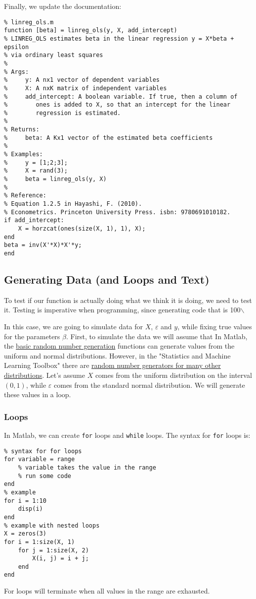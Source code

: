 \documentclass[12pt, a4paper]{article}
\begin{document}
Finally, we update the documentation:
\lstset{language=matlab,label= ,caption= ,captionpos=b,firstnumber=1,numbers=left,style=Matlab-editor}
\begin{lstlisting}
% linreg_ols.m
function [beta] = linreg_ols(y, X, add_intercept)
% LINREG_OLS estimates beta in the linear regression y = X*beta + epsilon
% via ordinary least squares
%
% Args:
%     y: A nx1 vector of dependent variables
%     X: A nxK matrix of independent variables
%     add_intercept: A boolean variable. If true, then a column of
%        ones is added to X, so that an intercept for the linear
%        regression is estimated.
%
% Returns:
%     beta: A Kx1 vector of the estimated beta coefficients
%
% Examples:
%     y = [1;2;3];
%     X = rand(3);
%     beta = linreg_ols(y, X)
%
% Reference:
% Equation 1.2.5 in Hayashi, F. (2010).
% Econometrics. Princeton University Press. isbn: 9780691010182.
if add_intercept:
    X = horzcat(ones(size(X, 1), 1), X);
end
beta = inv(X'*X)*X'*y;
end
\end{lstlisting}
\subsection{Generating Data (and Loops and Text)}
\label{sec:org2098963}
To test if our function is actually doing what we think it is doing, we need to test it.
Testing is imperative when programming, since generating code that is 100$\backslash$%

In this case, we are going to simulate data for \(X\), \(\varepsilon\) and \(y\), while fixing true values for the parameters \(\beta\).
First, to simulate the data we will assume that
In Matlab, the \href{https://www.mathworks.com/help/matlab/random-number-generation.html}{basic random number generation} functions can generate values from the uniform and normal distributions.
However, in the "Statistics and Machine Learning Toolbox" there are \href{https://www.mathworks.com/help/stats/random-number-generation.html}{random number generators for many other distributions}.
Let's assume \(X\) comes from the uniform distribution on the interval \((0, 1)\), while \(\varepsilon\) comes from the standard normal distribution.
We will generate these values in a loop.

\subsubsection{Loops}
\label{sec:org2d3b01d}
In Matlab, we can create \texttt{for} loops and \texttt{while} loops.
The syntax for \texttt{for} loops is:
\lstset{language=matlab,label= ,caption= ,captionpos=b,firstnumber=1,numbers=left,style=Matlab-editor}
\begin{lstlisting}
% syntax for for loops
for variable = range
    % variable takes the value in the range
    % run some code
end
% example
for i = 1:10
    disp(i)
end
% example with nested loops
X = zeros(3)
for i = 1:size(X, 1)
    for j = 1:size(X, 2)
        X(i, j) = i + j;
    end
end
\end{lstlisting}
For loops will terminate when all values in the range are exhausted.
\end{document}
